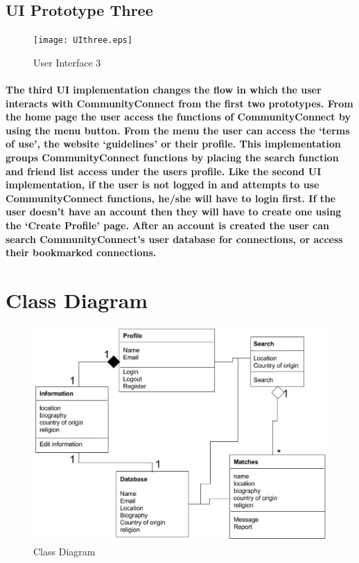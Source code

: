 \documentclass[12pt]{article}
\begin{document}
  \subsection{\bf UI Prototype Three}

    \begin{figure}[H]
            \texttt{[image: UIthree.eps]}
            \caption{User Interface 3}
            \label{fig: User Interface 3}
    \end{figure}

      \paragraph{\normalfont \indent The third UI implementation changes the flow in which the user interacts with CommunityConnect from the first two prototypes. From the home page the user access the functions of CommunityConnect by using the menu button. From the menu the user can access the ‘terms of use’, the website ‘guidelines’ or their profile. This implementation groups CommunityConnect functions by placing the search function and friend list access under the users profile. Like the second UI implementation, if the user is not logged in and attempts to use CommunityConnect functions, he/she will have to login first. If the user doesn't have an account then they will have to create one using the ‘Create Profile’ page. After an account is created the user can search CommunityConnect’s user database for connections, or access their bookmarked connections.
      }

\section{\bf Class Diagram}
      \begin{figure}[H]
              \includegraphics[width =\linewidth]{CC_class_diagram.eps}
                \caption{Class Diagram}
                \label{fig: Class Diagram}
      \end{figure}
\end{document}

